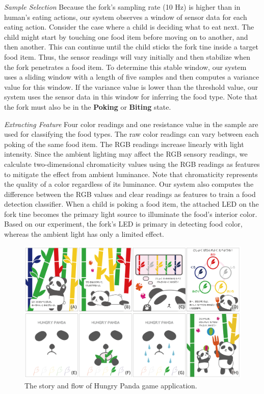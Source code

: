 \textit{Sample Selection}
\newline
Because the fork's sampling rate (10 Hz) is higher 
than in human's eating actions, 
our system observes a window of sensor data for each eating action. 
Consider the case where a child is deciding what to eat next. 
The child might start by touching one food item before moving on to another, and then another. 
This can continue until the child sticks the fork tine inside a target food item. 
Thus, the sensor readings will vary initially and then stabilize when the fork penetrates a food item. 
To determine this stable window, 
our system uses a sliding window with a length of five samples and then computes a variance value for this window. 
If the variance value is lower than the threshold value, 
our system uses the sensor data in this window for inferring the food type. 
Note that the fork must also be in the \textbf{Poking} or \textbf{Biting} state. 

\textit{Extracting Feature}
\newline
Four color readings and one resistance value 
in the sample are used for classifying the food types. 
The raw color readings can vary between each poking of the same food item. 
The RGB readings increase linearly with light intensity. 
Since the ambient lighting may affect the RGB sensory readings, 
we calculate two-dimensional chromaticity values \cite{Broadbent:2004} using the RGB readings 
as features to mitigate the effect from ambient luminance. 
Note that chromaticity represents the quality of a color regardless of its luminance. 
Our system also computes the difference between the RGB values and clear readings 
as features to train a food detection classifier. 
When a child is poking a food item, the attached LED on the fork tine becomes the primary light source 
to illuminate the food's interior color. 
Based on our experiment, the fork's LED is primary in detecting food color, 
whereas the ambient light has only a limited effect. 

\begin{figure}[!t]
\begin{center}
\includegraphics[width=15cm]{image/HP_app.png}
\caption{The story and flow of Hungry Panda game application.}
\label{panda}
\end{center}
\end{figure}

